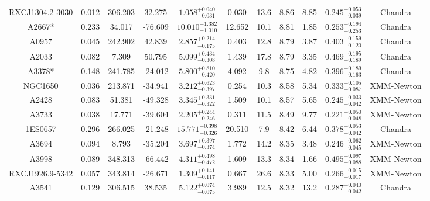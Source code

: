 \documentclass{aa}   %
\begin{document}
\begin{table}[h!]
\begin{center}
\begin{tabular}{ c  c  c  c c c c c c c c }
RXCJ1304.2-3030     		&		0.012	&	306.203	&	32.275	& $	1.058^{+0.040}_{-0.031}$  &      0.030	&  13.6	&	8.86	&	8.85	&	$ 0.245^{+0.053}_{-0.039}  $ &	 Chandra      \\
A2667*              		&		0.233	&	34.017	&	-76.609	& $ 10.010^{+1.382}_{-1.010}$ &     12.652	&  10.1	&	8.81	&	1.85	&	$ 0.253^{+0.194}_{-0.253}  $ &	  Chandra     \\
A0957               		&		0.045	&	242.902	&	42.839	& $	2.857^{+0.214}_{-0.175}$  &      0.403	&  12.8	&	8.79	&	3.87	&	$ 0.403^{+0.159}_{-0.120}  $ &	  Chandra     \\
A2033               		&		0.082	&	7.309	&	50.795	& $	5.099^{+0.434}_{-0.308}$  &      1.439	&  17.8	&	8.79	&	3.35	&	$ 0.469^{+0.195}_{-0.189}  $ &	  Chandra     \\
A3378*              		&		0.148	&	241.785	&	-24.012	& $	5.800^{+0.810}_{-0.420}$  &      4.092	&  9.8	&	8.75	&	4.82	&	$ 0.396^{+0.189}_{-0.163}  $ &	  Chandra     \\
NGC1650             		&		0.036	&	213.871	&	-34.941	& $	3.212^{+0.623}_{-0.397}$  &      0.254	&  10.3	&	8.58	&	5.34	&	$ 0.333^{+0.105}_{-0.087}  $ &	  XMM-Newton  \\
A2428               		&		0.083	&	51.381	&	-49.328	& $	3.345^{+0.331}_{-0.322}$  &      1.509	&  10.1	&	8.57	&	5.65	&	$ 0.245^{+0.033}_{-0.042}  $ &	 XMM-Newton   \\
A3733               		&		0.038	&	17.771	&	-39.604	& $	2.205^{+0.244}_{-0.246}$  &      0.311	&  11.5	&	8.49	&	9.77	&	$ 0.221^{+0.050}_{-0.048}  $ &	 XMM-Newton   \\
1ES0657             		&		0.296	&	266.025	&	-21.248	& $ 15.771^{+0.398}_{-0.326}$ &     20.510	&  7.9	&	8.42	&	6.44	&	$ 0.378^{+0.053}_{-0.042}  $ &	 Chandra      \\
A3694               		&		0.094	&	8.793	&	-35.204	& $	3.697^{+0.397}_{-0.374}$  &      1.772	&  14.2	&	8.35	&	3.48	&	$ 0.246^{+0.062}_{-0.045}  $ &	  XMM-Newton  \\
A3998               		&		0.089	&	348.313	&	-66.442	& $	4.311^{+0.498}_{-0.472}$  &      1.609	&  13.3	&	8.34	&	1.66	&	$ 0.495^{+0.097}_{-0.088}  $ &	  XMM-Newton  \\
RXCJ1926.9-5342     		&		0.057	&	343.814	&	-26.671	& $	1.309^{+0.141}_{-0.117}$  &      0.667	&  26.6	&	8.33	&	5.00	&	$ 0.266^{+0.015}_{-0.017}  $ &	 XMM-Newton   \\
A3541               		&		0.129	&	306.515	&	38.535	& $	5.122^{+0.074}_{-0.075}$  &      3.989	&  12.5	&	8.32	&	13.2	&	$ 0.287^{+0.040}_{-0.042}  $ &	 Chandra      \\

\end{tabular}
\end{center}
\end{table}
\end{document}
